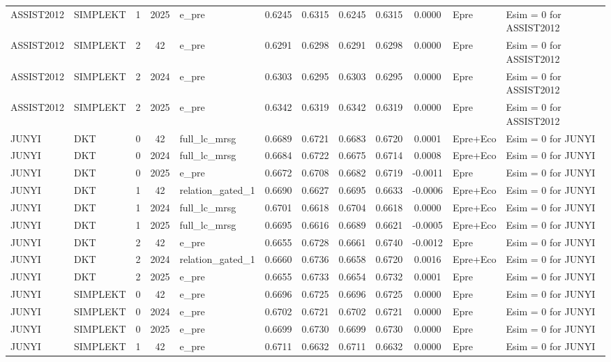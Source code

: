 \begin{table}[h]
\begin{tabular}{llcclcccccl}
ASSIST2012 & SIMPLEKT & 1 & 2025 & e_pre & 0.6245 & 0.6315 & 0.6245 & 0.6315 & 0.0000 & Epre & Esim = 0 for ASSIST2012 \\
ASSIST2012 & SIMPLEKT & 2 & 42 & e_pre & 0.6291 & 0.6298 & 0.6291 & 0.6298 & 0.0000 & Epre & Esim = 0 for ASSIST2012 \\
ASSIST2012 & SIMPLEKT & 2 & 2024 & e_pre & 0.6303 & 0.6295 & 0.6303 & 0.6295 & 0.0000 & Epre & Esim = 0 for ASSIST2012 \\
ASSIST2012 & SIMPLEKT & 2 & 2025 & e_pre & 0.6342 & 0.6319 & 0.6342 & 0.6319 & 0.0000 & Epre & Esim = 0 for ASSIST2012 \\
JUNYI & DKT & 0 & 42 & full_lc_mrsg & 0.6689 & 0.6721 & 0.6683 & 0.6720 & 0.0001 & Epre+Eco & Esim = 0 for JUNYI \\
JUNYI & DKT & 0 & 2024 & full_lc_mrsg & 0.6684 & 0.6722 & 0.6675 & 0.6714 & 0.0008 & Epre+Eco & Esim = 0 for JUNYI \\
JUNYI & DKT & 0 & 2025 & e_pre & 0.6672 & 0.6708 & 0.6682 & 0.6719 & -0.0011 & Epre & Esim = 0 for JUNYI \\
JUNYI & DKT & 1 & 42 & relation_gated_1 & 0.6690 & 0.6627 & 0.6695 & 0.6633 & -0.0006 & Epre+Eco & Esim = 0 for JUNYI \\
JUNYI & DKT & 1 & 2024 & full_lc_mrsg & 0.6701 & 0.6618 & 0.6704 & 0.6618 & 0.0000 & Epre+Eco & Esim = 0 for JUNYI \\
JUNYI & DKT & 1 & 2025 & full_lc_mrsg & 0.6695 & 0.6616 & 0.6689 & 0.6621 & -0.0005 & Epre+Eco & Esim = 0 for JUNYI \\
JUNYI & DKT & 2 & 42 & e_pre & 0.6655 & 0.6728 & 0.6661 & 0.6740 & -0.0012 & Epre & Esim = 0 for JUNYI \\
JUNYI & DKT & 2 & 2024 & relation_gated_1 & 0.6660 & 0.6736 & 0.6658 & 0.6720 & 0.0016 & Epre+Eco & Esim = 0 for JUNYI \\
JUNYI & DKT & 2 & 2025 & e_pre & 0.6655 & 0.6733 & 0.6654 & 0.6732 & 0.0001 & Epre & Esim = 0 for JUNYI \\
JUNYI & SIMPLEKT & 0 & 42 & e_pre & 0.6696 & 0.6725 & 0.6696 & 0.6725 & 0.0000 & Epre & Esim = 0 for JUNYI \\
JUNYI & SIMPLEKT & 0 & 2024 & e_pre & 0.6702 & 0.6721 & 0.6702 & 0.6721 & 0.0000 & Epre & Esim = 0 for JUNYI \\
JUNYI & SIMPLEKT & 0 & 2025 & e_pre & 0.6699 & 0.6730 & 0.6699 & 0.6730 & 0.0000 & Epre & Esim = 0 for JUNYI \\
JUNYI & SIMPLEKT & 1 & 42 & e_pre & 0.6711 & 0.6632 & 0.6711 & 0.6632 & 0.0000 & Epre & Esim = 0 for JUNYI \\

\end{tabular}
\end{table}
